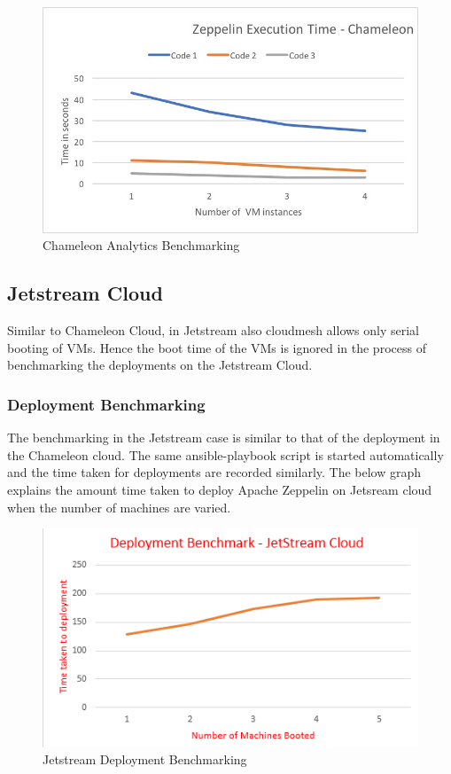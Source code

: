 \documentclass[9pt,twocolumn,twoside]{../../styles/osajnl}
\begin{document}
	\begin{figure}
		\includegraphics[width=\linewidth]{./images/Chameleon_analytic_deployment}
		\caption{Chameleon Analytics Benchmarking}
		\label{fig:Chameleon Analytics Benchmarking}
	\end{figure}
	
	\subsection{Jetstream Cloud}
	
	Similar to Chameleon Cloud, in Jetstream also cloudmesh allows 
	only 
	serial booting of VMs. Hence the boot time of the VMs is ignored 
	in 
	the process of benchmarking the deployments on the Jetstream 
	Cloud.
	
	
	\subsubsection{Deployment Benchmarking}
	
	The benchmarking in the Jetstream case is similar to that of the 
	deployment in the Chameleon cloud. The same ansible-playbook 
	script 
	is started automatically and the time taken for deployments are 
	recorded similarly. The below graph explains the amount time 
	taken to 
	deploy Apache Zeppelin on Jetsream cloud when the number of 
	machines 
	are varied.
	
	\begin{figure}
		\includegraphics[width=\linewidth]{./images/jetstream_deployment_time}
		\caption{Jetstream Deployment Benchmarking}
		\label{fig:Jetstream Deployment Benchmarking}
	\end{figure}
	
\end{document}
